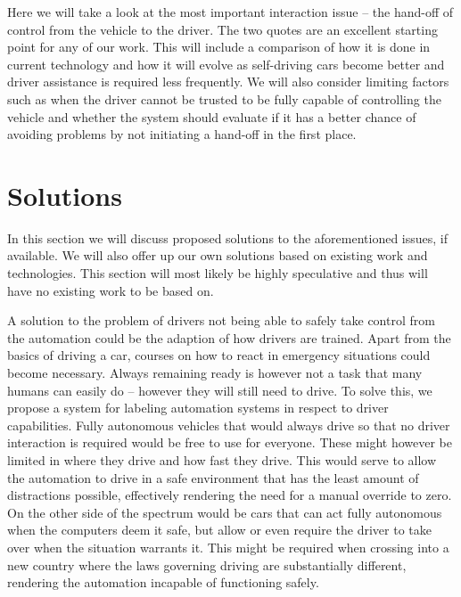 \documentclass{acm_proc_article-sp}
\begin{document}
Here we will take a look at the most important interaction issue – the hand-off of control from the vehicle to the driver.
The two quotes are an excellent starting point for any of our work.
This will include a comparison of how it is done in current technology and how it will evolve as self-driving cars become better and driver assistance is required less frequently.
We will also consider limiting factors such as when the driver cannot be trusted to be fully capable of controlling the vehicle and whether the system should evaluate if it has a better chance of avoiding problems by not initiating a hand-off in the first place.

\section{Solutions}
\label{solutions}

In this section we will discuss proposed solutions to the aforementioned issues, if available.
We will also offer up our own solutions based on existing work and technologies.
This section will most likely be highly speculative and thus will have no existing work to be based on.

A solution to the problem of drivers not being able to safely take control from the automation could be the adaption of how drivers are trained.
Apart from the basics of driving a car, courses on how to react in emergency situations could become necessary.
Always remaining ready is however not a task that many humans can easily do – however they will still need to drive.
To solve this, we propose a system for labeling automation systems in respect to driver capabilities.
Fully autonomous vehicles that would always drive so that no driver interaction is required would be free to use for everyone.
These might however be limited in where they drive and how fast they drive.
This would serve to allow the automation to drive in a safe environment that has the least amount of distractions possible, effectively rendering the need for a manual override to zero.
On the other side of the spectrum would be cars that can act fully autonomous when the computers deem it safe, but allow or even require the driver to take over when the situation warrants it.
This might be required when crossing into a new country where the laws governing driving are substantially different, rendering the automation incapable of functioning safely.
\end{document}
